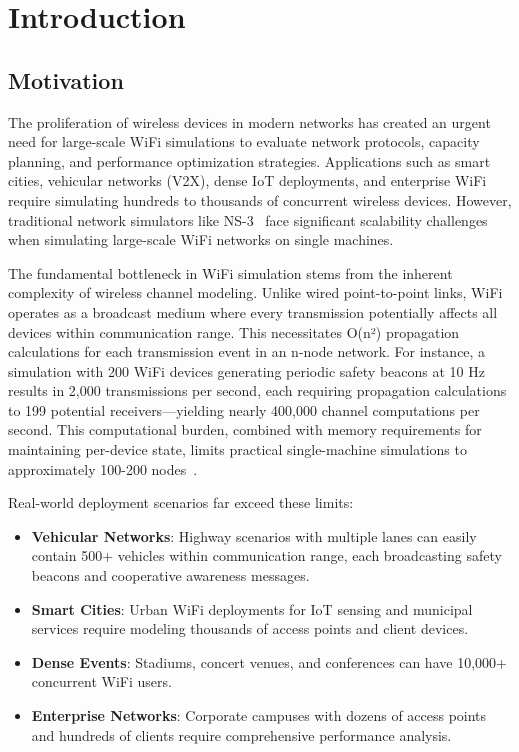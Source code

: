 \section{Introduction}
\label{sec:introduction}

\subsection{Motivation}

The proliferation of wireless devices in modern networks has created an urgent need for large-scale WiFi simulations to evaluate network protocols, capacity planning, and performance optimization strategies. Applications such as smart cities, vehicular networks (V2X), dense IoT deployments, and enterprise WiFi require simulating hundreds to thousands of concurrent wireless devices. However, traditional network simulators like NS-3~\cite{ns3} face significant scalability challenges when simulating large-scale WiFi networks on single machines.

The fundamental bottleneck in WiFi simulation stems from the inherent complexity of wireless channel modeling. Unlike wired point-to-point links, WiFi operates as a broadcast medium where every transmission potentially affects all devices within communication range. This necessitates O(n²) propagation calculations for each transmission event in an n-node network. For instance, a simulation with 200 WiFi devices generating periodic safety beacons at 10 Hz results in 2,000 transmissions per second, each requiring propagation calculations to 199 potential receivers—yielding nearly 400,000 channel computations per second. This computational burden, combined with memory requirements for maintaining per-device state, limits practical single-machine simulations to approximately 100-200 nodes~\cite{nsnam-scalability}.

Real-world deployment scenarios far exceed these limits:
\begin{itemize}
    \item \textbf{Vehicular Networks}: Highway scenarios with multiple lanes can easily contain 500+ vehicles within communication range, each broadcasting safety beacons and cooperative awareness messages.
    \item \textbf{Smart Cities}: Urban WiFi deployments for IoT sensing and municipal services require modeling thousands of access points and client devices.
    \item \textbf{Dense Events}: Stadiums, concert venues, and conferences can have 10,000+ concurrent WiFi users.
    \item \textbf{Enterprise Networks}: Corporate campuses with dozens of access points and hundreds of clients require comprehensive performance analysis.
\end{itemize}

